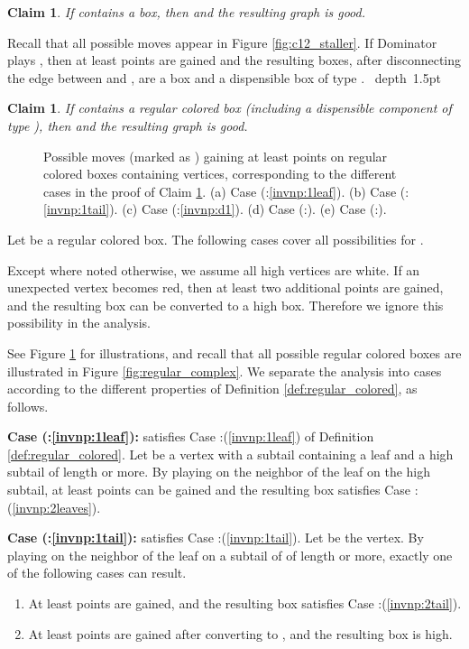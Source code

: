 \documentclass[11pt]{article}
\def\Proof{\par\noindent{\bf Proof:~}}
\def\blackslug{\hbox{\hskip 1pt \vrule width 4pt height 8pt
    depth 1.5pt \hskip 1pt}}
\def\QED{\quad\blackslug\lower 8.5pt\null\par}
\def\dnsitem{\vspace{-7pt}\item}
\newtheorem{claim}[theorem]{Claim}
\theoremstyle{definition}
\begin{document}
\begin{claim}
\label{claim:c12_dom}
If  contains a  box, then  and the resulting graph  is good.
\end{claim}
\Proof
Recall that all possible moves appear in Figure \ref{fig:c12_staller}. 
If Dominator plays , then at least  points are gained and the resulting boxes, after disconnecting the edge between  and , are a  box and a dispensible box of type .
\QED

\begin{claim}
\label{claim:b2_dom}
If  contains a regular colored box (including a dispensible component of type ),
then  and the resulting graph  is good.
\end{claim}
\begin{figure}[thbp]
  \caption{\sf Possible moves (marked as ) gaining at least  points on regular colored boxes containing  vertices, corresponding to the different cases in the proof of Claim \ref{claim:b2_dom}.
		(a) Case (:\ref{invnp:1leaf}). 
		(b) Case (:\ref{invnp:1tail}). 
		(c) Case (:\ref{invnp:d1}).
		(d) Case (:). 
		(e) Case (:).}
  \medskip
  \centering
  \label{fig:regular_colored_b2_dom}
\end{figure}
\Proof
Let  be a regular colored box.
The following cases cover all possibilities for .

Except where noted otherwise, we assume all high vertices are white. If an unexpected vertex becomes red, then at least two additional points are gained, and the resulting box can be converted to a high box. Therefore we ignore this possibility in the analysis.

See Figure \ref{fig:regular_colored_b2_dom} for illustrations, and recall that all possible regular colored boxes are illustrated in Figure \ref{fig:regular_complex}.
We separate the analysis into cases according to the different properties of Definition \ref{def:regular_colored}, as follows.
\bigskip
\par\noindent
{\bf Case (:\ref{invnp:1leaf}):}
 satisfies Case :(\ref{invnp:1leaf}) of Definition \ref{def:regular_colored}.
Let  be a vertex with a subtail containing a  leaf and a high subtail of length  or more.
By playing on the neighbor of the leaf on the high subtail,
at least  points can be gained and the resulting box satisfies Case :(\ref{invnp:2leaves}).

\bigskip
\par\noindent
{\bf Case (:\ref{invnp:1tail}):}
 satisfies Case :(\ref{invnp:1tail}). 
Let  be the  vertex. 
By playing on the neighbor of the leaf on a subtail of  of length  or more, exactly one of the following cases can result.
\begin{enumerate}
	\dnsitem At least  points are gained, and the resulting box satisfies Case :(\ref{invnp:2tail}).
	\dnsitem At least  points are gained after converting  to , and the resulting box is high.
\end{enumerate}
\end{document}
